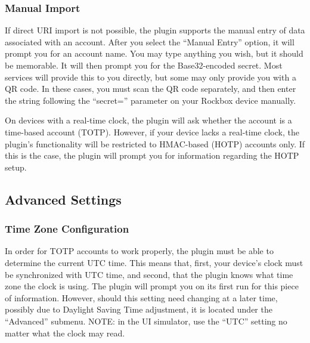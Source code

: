 \subsubsection{Manual Import}
If direct URI import is not possible, the plugin supports the manual
entry of data associated with an account. After you select the
``Manual Entry'' option, it will prompt you for an account name. You
may type anything you wish, but it should be memorable. It will then
prompt you for the Base32-encoded secret. Most services will provide
this to you directly, but some may only provide you with a QR code. In
these cases, you must scan the QR code separately, and then enter the
string following the ``secret='' parameter on your Rockbox device
manually.

On devices with a real-time clock,  the plugin
will ask whether the account is a time-based account
(TOTP).  However, if your device lacks a
real-time clock, the plugin's functionality will be restricted to
HMAC-based (HOTP) accounts only. If this is the case, the plugin will
prompt you for information regarding the HOTP setup.

 {
  \subsection{Advanced Settings}
  \subsubsection{Time Zone Configuration}
  In order for TOTP accounts to work properly, the plugin must be able
  to determine the current UTC time. This means that, first, your
  device's clock must be synchronized with UTC time, and second, that
  the plugin knows what time zone the clock is using. The plugin will
  prompt you on its first run for this piece of information. However,
  should this setting need changing at a later time, possibly due to
  Daylight Saving Time adjustment, it is located under the
  ``Advanced'' submenu. NOTE: in the UI simulator, use the ``UTC''
  setting no matter what the clock may read. }
